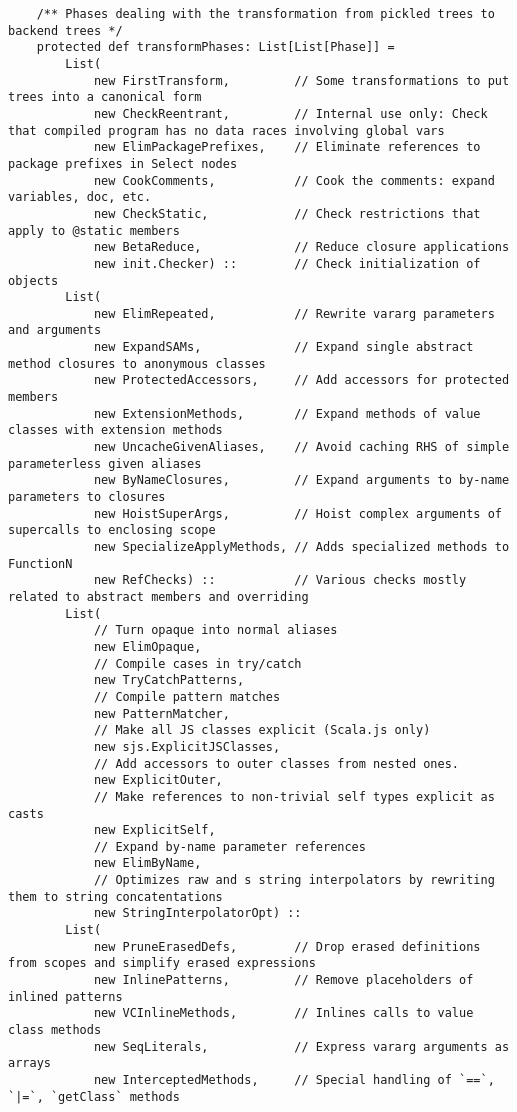 \documentclass[letterpaper,12pt,titlepage,oneside,final]{book}
\begin{document}
\begin{verbatim}
	/** Phases dealing with the transformation from pickled trees to backend trees */
	protected def transformPhases: List[List[Phase]] =
		List(
			new FirstTransform,         // Some transformations to put trees into a canonical form
			new CheckReentrant,         // Internal use only: Check that compiled program has no data races involving global vars
			new ElimPackagePrefixes,    // Eliminate references to package prefixes in Select nodes
			new CookComments,           // Cook the comments: expand variables, doc, etc.
			new CheckStatic,            // Check restrictions that apply to @static members
			new BetaReduce,             // Reduce closure applications
			new init.Checker) ::        // Check initialization of objects
		List(
			new ElimRepeated,           // Rewrite vararg parameters and arguments
			new ExpandSAMs,             // Expand single abstract method closures to anonymous classes
			new ProtectedAccessors,     // Add accessors for protected members
			new ExtensionMethods,       // Expand methods of value classes with extension methods
			new UncacheGivenAliases,    // Avoid caching RHS of simple parameterless given aliases
			new ByNameClosures,         // Expand arguments to by-name parameters to closures
			new HoistSuperArgs,         // Hoist complex arguments of supercalls to enclosing scope
			new SpecializeApplyMethods, // Adds specialized methods to FunctionN
			new RefChecks) ::           // Various checks mostly related to abstract members and overriding
		List(
		 	// Turn opaque into normal aliases
			new ElimOpaque,            
			// Compile cases in try/catch
			new TryCatchPatterns,      
			// Compile pattern matches
			new PatternMatcher,         
			// Make all JS classes explicit (Scala.js only)
			new sjs.ExplicitJSClasses,  
			// Add accessors to outer classes from nested ones.
			new ExplicitOuter,          
			// Make references to non-trivial self types explicit as casts
			new ExplicitSelf,           
			// Expand by-name parameter references
			new ElimByName,             
			// Optimizes raw and s string interpolators by rewriting them to string concatentations
			new StringInterpolatorOpt) :: 
		List(
			new PruneErasedDefs,        // Drop erased definitions from scopes and simplify erased expressions
			new InlinePatterns,         // Remove placeholders of inlined patterns
			new VCInlineMethods,        // Inlines calls to value class methods
			new SeqLiterals,            // Express vararg arguments as arrays
			new InterceptedMethods,     // Special handling of `==`, `|=`, `getClass` methods

\end{verbatim}
\end{document}
